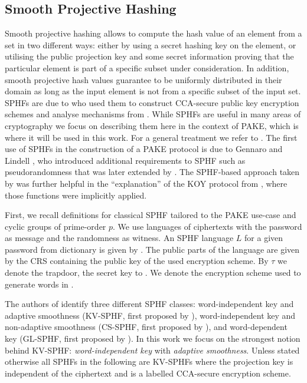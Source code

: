 \subsection{Smooth Projective Hashing}
Smooth projective hashing allows to compute the hash value of an element from a set in two different ways:
either by using a secret hashing key on the element, or utilising the public projection key and some secret information proving that the particular element is part of a specific subset under consideration.
In addition, smooth projective hash values guarantee to be uniformly distributed in their domain as long as the input element is not from a specific subset of the input set.
\aclp{SPHF} are due to \citet{Cramer2002} who used them to construct \ac{CCA}-secure public key encryption schemes and analyse mechanisms from \cite{Cramer1998}.
While \acp{SPHF} are useful in many areas of cryptography we focus on describing them here in the context of \ac{PAKE}, which is where it will be used in this work.
For a general treatment we refer to \cite{Cramer2002,cryptoeprint:2013:034}.
The first use of \acp{SPHF} in the construction of a \ac{PAKE} protocol is due to Gennaro and Lindell \cite{Gennaro2003}, who introduced additional requirements to \ac{SPHF} such as pseudorandomness that was later extended by \citet{Katz2011}.
The \ac{SPHF}-based approach taken by \citet{Gennaro2003} was further helpful in the ``explanation'' of the KOY protocol from \citet{KatzOY01}, where those functions were implicitly applied.

First, we recall definitions for classical \ac{SPHF} tailored to the \ac{PAKE} use-case and cyclic groups \GG of prime-order $p$.
We use languages of ciphertexts with the password as message and the randomness as witness.
An \ac{SPHF} language $L$ for a given password \pwd from dictionary \cD is given by \Lpwd. 
The public parts of the language are given by the \acl{CRS} \crs containing the public key \pk of the used encryption scheme.
By $\tau$ we denote the \crs trapdoor, the secret key to \pk.
We denote \cL the encryption scheme used to generate words in \Lpwd.

The authors of \cite{Benhamouda2013} identify three different SPHF classes:
word-independent key and adaptive smoothness (KV-SPHF, first proposed by \citet{Katz2011}),
word-independent key and non-adaptive smoothness (CS-SPHF, first proposed by \citet{Cramer2002}),
and word-dependent key (GL-SPHF, first proposed by \citet{Gennaro2003}).
In this work we focus on the strongest notion behind KV-SPHF: \emph{word-independent key} with \emph{adaptive smoothness}.
Unless stated otherwise all \acp{SPHF} in the following are KV-SPHFs where the projection key is independent of the ciphertext and \cL is a labelled CCA-secure encryption scheme.

